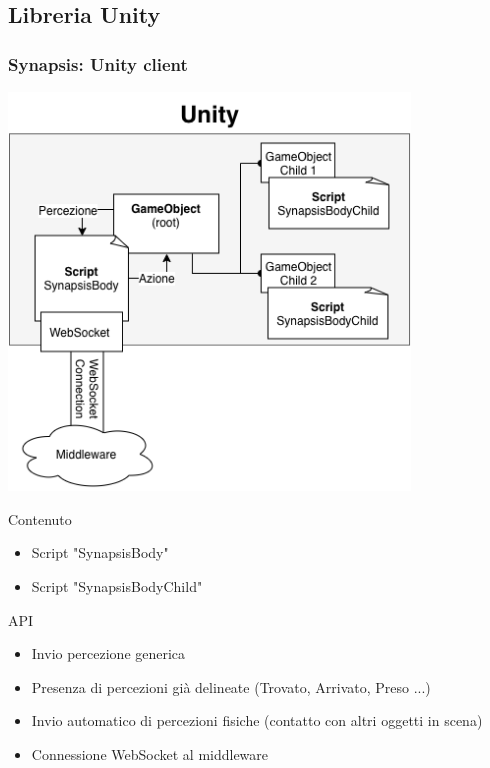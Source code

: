 \documentclass[handout]{beamer}\mode<presentation>{\usetheme{AMSCesenaBleu}}
\begin{document}
\subsection{Libreria Unity}

\begin{frame}[fragile]
\frametitle[Synapsis, Liberie JaCaMo e Unity]{Synapsis: Unity client}
\begin{minipage}{0.48\linewidth}
    \centering
    \includegraphics[width=0.8\textwidth]{figures/struttura_libreria_unity.png}
\end{minipage}
\begin{minipage}{0.48\linewidth}
    \begin{block}{Contenuto}
    \begin{itemize}
        \item Script "SynapsisBody"
        \item Script "SynapsisBodyChild"
    \end{itemize}
    \end{block}
    \begin{block}{API}
    \begin{itemize}
        \item Invio percezione generica
        \item Presenza di percezioni già delineate (Trovato, Arrivato, Preso ...)
        \item Invio automatico di percezioni fisiche (contatto con altri oggetti in scena)
        \item Connessione WebSocket al middleware
    \end{itemize}
    \end{block}
\end{minipage}
\end{frame}
\end{document}
